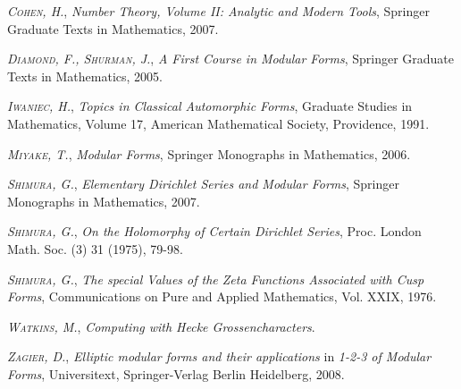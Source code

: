 \documentclass[twoside,10pt]{article}
\begin{document}
\begin{thebibliography}{DDDD}%
    {\scshape\itshape Cohen, H.}, \emph{Number Theory, Volume II: Analytic and Modern Tools}, Springer Graduate Texts in Mathematics, 2007.

    {\scshape\itshape Diamond, F., Shurman, J.}, \emph{A First Course in Modular Forms}, Springer Graduate Texts in Mathematics, 2005.
    
	{\scshape\itshape Iwaniec, H.}, \emph{Topics in Classical Automorphic Forms}, Graduate Studies in Mathematics, Volume 17, American Mathematical Society, Providence, 1991.
	
    {\scshape\itshape Miyake, T.}, \emph{Modular Forms}, Springer Monographs in Mathematics, 2006.
    
    {\scshape\itshape Shimura, G.}, \emph{Elementary Dirichlet Series
and Modular Forms}, Springer Monographs in Mathematics, 2007.
    
    {\scshape\itshape Shimura, G.}, \emph{On the Holomorphy of Certain Dirichlet Series}, Proc. London Math. Soc. (3) 31 (1975), 79-98.

    {\scshape\itshape Shimura, G.}, \emph{The special Values of the Zeta Functions Associated with Cusp Forms}, Communications on Pure and Applied Mathematics, Vol. XXIX, 1976.
    
    {\scshape\itshape Watkins, M.}, \emph{Computing with Hecke Grossencharacters}.    
    
    {\scshape\itshape Zagier, D.}, \emph{Elliptic modular forms and their applications} in \emph{1-2-3 of Modular Forms}, Universitext, Springer-Verlag Berlin Heidelberg, 2008.
\end{thebibliography}
\end{document}
